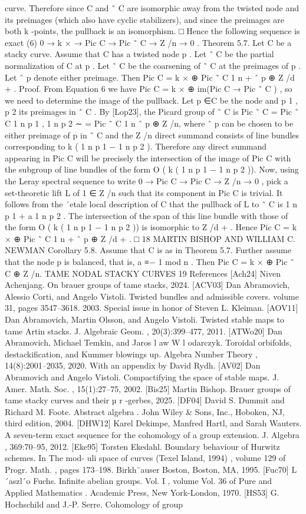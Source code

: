 \documentclass{article}
\begin{document}
curve. Therefore since C and ˜ C are isomorphic away from the twisted node and its preimages (which also have cyclic stabilizers), and since the preimages are both k -points, the pullback is an isomorphism. □ Hence the following sequence is exact (6) 0 → k × → Pic C → Pic ˜ C → Z /n → 0 . Theorem 5.7. Let C be a stacky curve. Assume that C has a twisted node p . Let ˜ C be the partial normalization of C at p . Let ˜ C be the coarsening of ˜ C at the preimages of p . Let ˆ p denote either preimage. Then Pic C = k × ⊕ Pic ˜ C 1 n + ˆ p ⊕ Z /d + . Proof. From Equation 6 we have Pic C = k × ⊕ im(Pic C → Pic ˜ C ) , so we need to determine the image of the pullback. Let p ∈C be the node and p 1 , p 2 its preimages in ˜ C . By [Lop23], the Picard group of ˜ C is Pic ˜ C = Pic ˜ C 1 n p 1 , 1 n p 2 ∼ = Pic ˜ C 1 n ˆ p ⊕ Z /n, where ˆ p can be chosen to be either preimage of p in ˜ C and the Z /n direct summand consists of line bundles corresponding to k ( 1 n p 1 − 1 n p 2 ). Therefore any direct summand appearing in Pic C will be precisely the intersection of the image of Pic C with the subgroup of line bundles of the form O ( k ( 1 n p 1 − 1 n p 2 )). Now, using the Leray spectral sequence to write 0 → Pic C → Pic C → Z /n → 0 , pick a set-theoretic lift L of 1 ∈ Z /n such that its component in Pic C is trivial. It follows from the ´etale local description of C that the pullback of L to ˜ C is 1 n p 1 + a 1 n p 2 . The intersection of the span of this line bundle with those of the form O ( k ( 1 n p 1 − 1 n p 2 )) is isomorphic to Z /d + . Hence Pic C = k × ⊕ Pic ˜ C 1 n + ˆ p ⊕ Z /d + . □ 18 MARTIN BISHOP AND WILLIAM C. NEWMAN Corollary 5.8. Assume that C is as in Theorem 5.7. Further assume that the node p is balanced, that is, a ≡− 1 mod n . Then Pic C = k × ⊕ Pic ˜ C ⊕ Z /n. TAME NODAL STACKY CURVES 19 References [Ach24] Niven Achenjang. On brauer groups of tame stacks, 2024. [ACV03] Dan Abramovich, Alessio Corti, and Angelo Vistoli. Twisted bundles and admissible covers. volume 31, pages 3547–3618. 2003. Special issue in honor of Steven L. Kleiman. [AOV11] Dan Abramovich, Martin Olsson, and Angelo Vistoli. Twisted stable maps to tame Artin stacks. J. Algebraic Geom. , 20(3):399–477, 2011. [ATWo20] Dan Abramovich, Michael Temkin, and Jaros l aw W l odarczyk. Toroidal orbifolds, destackification, and Kummer blowings up. Algebra Number Theory , 14(8):2001–2035, 2020. With an appendix by David Rydh. [AV02] Dan Abramovich and Angelo Vistoli. Compactifying the space of stable maps. J. Amer. Math. Soc. , 15(1):27–75, 2002. [Bis25] Martin Bishop. Brauer groups of tame stacky curves and their µ r -gerbes, 2025. [DF04] David S. Dummit and Richard M. Foote. Abstract algebra . John Wiley & Sons, Inc., Hoboken, NJ, third edition, 2004. [DHW12] Karel Dekimpe, Manfred Hartl, and Sarah Wauters. A seven-term exact sequence for the cohomology of a group extension. J. Algebra , 369:70–95, 2012. [Eke95] Torsten Ekedahl. Boundary behaviour of Hurwitz schemes. In The mod- uli space of curves (Texel Island, 1994) , volume 129 of Progr. Math. , pages 173–198. Birkh¨auser Boston, Boston, MA, 1995. [Fuc70] L´aszl´o Fuchs. Infinite abelian groups. Vol. I , volume Vol. 36 of Pure and Applied Mathematics . Academic Press, New York-London, 1970. [HS53] G. Hochschild and J.-P. Serre. Cohomology of group 
\end{document}
